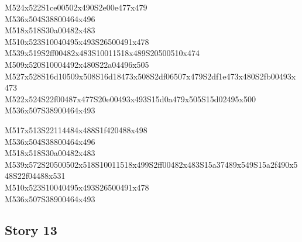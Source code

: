 \documentclass{article}
\begin{document}
\begin{multicols}{5}
\begin{center}
M524x522S1ce00502x490S2e00e477x479 %
\\M536x504S38800464x496 %
\\M518x518S30a00482x483 %
\\M510x523S10040495x493S26500491x478 %
\\M539x519S2ff00482x483S10011518x489S20500510x474 %
\\M509x520S10004492x480S22a04496x505 %
\\M527x528S16d10509x508S16d18473x508S2df06507x479S2df1e473x480S2fb00493x473 %
\\M522x524S22f00487x477S20e00493x493S15d0a479x505S15d02495x500 %
\\M536x507S38900464x493 %
\vfil
\columnbreak

M517x513S22114484x488S1f420488x498 %
\\M536x504S38800464x496 %
\\M518x518S30a00482x483 %
\\M539x572S20500502x518S10011518x499S2ff00482x483S15a37489x549S15a2f490x548S22f04488x531 %
\\M510x523S10040495x493S26500491x478 %
\\M536x507S38900464x493 %
\vfil

\end{center}
\end{multicols}

\subsection{Story 13}
\end{document}
